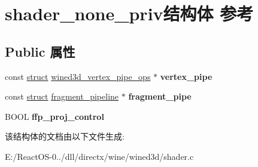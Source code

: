 \hypertarget{structshader__none__priv}{}\section{shader\+\_\+none\+\_\+priv结构体 参考}
\label{structshader__none__priv}
\subsection*{Public 属性}
\begin{DoxyCompactItemize}
\item 
\mbox{\label{structshader__none__priv_a6521f1bd11eb2fa0fe286423e0f4cc7e}} 
const \hyperlink{interfacestruct}{struct} \hyperlink{structwined3d__vertex__pipe__ops}{wined3d\+\_\+vertex\+\_\+pipe\+\_\+ops} $\ast$ {\bfseries vertex\+\_\+pipe}
\item 
\mbox{\label{structshader__none__priv_a538db69a672082b8cfc945dde17cdc33}} 
const \hyperlink{interfacestruct}{struct} \hyperlink{structfragment__pipeline}{fragment\+\_\+pipeline} $\ast$ {\bfseries fragment\+\_\+pipe}
\item 
\mbox{\label{structshader__none__priv_aa2315d5427983144d85777399e3420ac}} 
B\+O\+OL {\bfseries ffp\+\_\+proj\+\_\+control}
\end{DoxyCompactItemize}


该结构体的文档由以下文件生成\+:\begin{DoxyCompactItemize}
\item 
E\+:/\+React\+O\+S-\/0../dll/directx/wine/wined3d/shader.\+c\end{DoxyCompactItemize}
